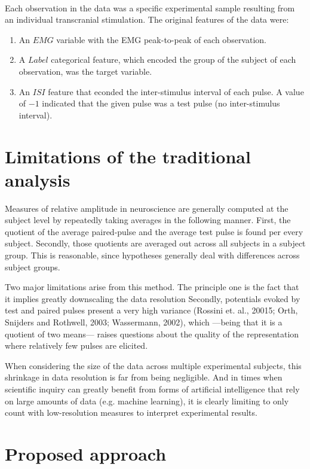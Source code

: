 \documentclass{article}
\begin{document}
\begin{multicols}{2}
~

Each observation in the data was a specific experimental sample resulting
from an individual transcranial stimulation. The original features of the data
were: 

\begin{enumerate}
    \item An $EMG$ variable with the EMG peak-to-peak of each observation.
    \item A $Label$ categorical feature, which encoded the group of
        the subject of each observation, was the target variable. 
    \item An $ISI$ feature that econded the inter-stimulus interval of each
        pulse. A value of $-1$ indicated that the given pulse was a test pulse (no
        inter-stimulus interval).
\end{enumerate}

\section{Limitations of the traditional analysis}

Measures of relative amplitude in neuroscience are generally computed at the
subject level by repeatedly taking averages in the following manner. First, the
quotient of the average paired-pulse and the average test pulse is found per
every subject. Secondly, those quotients are averaged out across all subjects in
a subject group. This is reasonable, since hypotheses generally deal with
differences across subject groups. 

Two major limitations arise from this method. The principle one is the fact that
it implies greatly downscaling the data resolution Secondly, potentials evoked
by test and paired pulses present a very high variance (Rossini et. al., 20015;
Orth, Snijders and Rothwell, 2003; Wassermann, 2002), which —being that it is a
quotient of two means—  raises questions about the quality of the representation
where relatively few pulses are elicited. 

When considering the size of the data across multiple experimental subjects,
this shrinkage in data resolution is far from being negligible. And in times
when scientific inquiry can greatly benefit from forms of artificial
intelligence that rely on large amounts of data (e.g. machine learning), it is
clearly limiting to only count with low-resolution measures to interpret
experimental results.


\section{Proposed approach}


\end{multicols}
\end{document}
